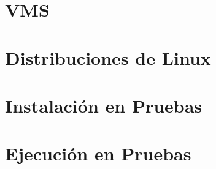 \section{VMS}
\section{Distribuciones de Linux}
\section{Instalación en Pruebas}
\section{Ejecución en Pruebas}
